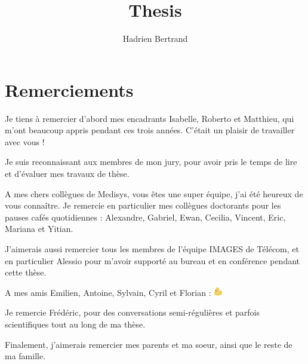 \documentclass[12pt,twoside,openright]{report}
\title{Thesis}
\author{Hadrien Bertrand}
\begin{document}
\begin{titlepage}
    
\end{titlepage}

\cleardoublepage



\cleardoublepage

\chapter*{Remerciements}

Je tiens à remercier d'abord mes encadrants Isabelle, Roberto et Matthieu, qui m'ont beaucoup appris pendant ces trois années. C'était un plaisir de travailler avec vous !

Je suis reconnaissant aux membres de mon jury, pour avoir pris le temps de lire et d'évaluer mes travaux de thèse.

A mes chers collègues de Medisys, vous êtes une super équipe, j'ai été heureux de vous connaître. Je remercie en particulier mes collègues doctorants pour les pauses cafés quotidiennes : Alexandre, Gabriel, Ewan, Cecilia, Vincent, Eric, Mariana et Yitian.

J'aimerais aussi remercier tous les membres de l'équipe IMAGES de Télécom, et en particulier Alessio pour m'avoir supporté au bureau et en conférence pendant cette thèse.

A mes amis Emilien, Antoine, Sylvain, Cyril et Florian : \includegraphics[height=1em]{duck.png}

Je remercie Frédéric, pour des conversations semi-régulières et parfois scientifiques tout au long de ma thèse.

Finalement, j'aimerais remercier mes parents et ma soeur, ainsi que le reste de ma famille.

\cleardoublepage

\dominitoc
{   
    \tableofcontents
}

\cleardoublepage

\listoffigures

\clearpage
 
\listoftables

\cleardoublepage


\pagestyle{fancy}
\fancyhf{}
\fancyhead[LO]{\fontsize{10}{12} \selectfont \slshape \rightmark}
\fancyhead[RE]{\fontsize{10}{12} \selectfont \slshape \leftmark}
\fancyhead[LE,RO]{\thepage}
\setlength{\headheight}{30pt}
\end{document}
